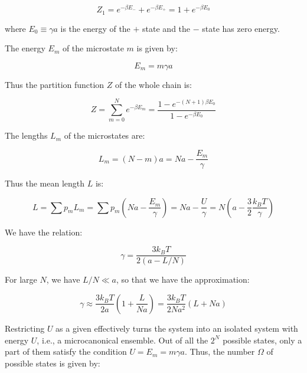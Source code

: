 \documentclass[12pt]{article}
\begin{document}
\begin{equation}
    Z_{1} = e^{-\beta E_{-}} + e^{-\beta E_{+}} = 1 + e^{-\beta E_{0}}
\end{equation}

where $E_{0} \equiv \gamma a$ is the energy of the $+$ state and the $-$ state has zero energy.

The energy $E_{m}$ of the microstate $m$ is given by:

\begin{equation}
    E_{m} = m \gamma a
\end{equation}

Thus the partition function $Z$ of the whole chain is:

\begin{equation}
    Z = \sum_{m=0}^{N} e^{-\beta E_{m}} = \frac{1 - e^{-(N+1)\beta E_{0}}}{1 - e^{-\beta E_{0}}}
\end{equation}

The lengths $L_{m}$ of the microstates are:

\begin{equation}
    L_{m} = (N - m)a = Na - \frac{E_{m}}{\gamma}
\end{equation}

Thus the mean length $L$ is:

\begin{equation}
    L = \sum p_{m} L_{m} = \sum p_{m} (Na - \frac{E_{m}}{\gamma}) = Na - \frac{U}{\gamma} = N \left( a - \frac{3}{2} \frac{k_{B} T}{\gamma} \right)
\end{equation}

We have the relation:

\begin{equation}
    \gamma = \frac{3k_{B} T}{2(a - L/N)}
\end{equation}

For large $N$, we have $L/N \ll a$, so that we have the approximation:

\begin{equation}
    \gamma \approx \frac{3k_{B} T}{2a} (1 + \frac{L}{Na}) = \frac{3k_{B} T}{2Na^{2}} (L + Na)
\end{equation}

Restricting $U$ as a given effectively turns the system into an isolated system with energy $U$, i.e., a microcanonical ensemble. Out of all the $2^{N}$ possible states, only a part of them satisfy the condition $U = E_{m} = m \gamma a$. Thus, the number $\Omega$ of possible states is given by:
\end{document}
